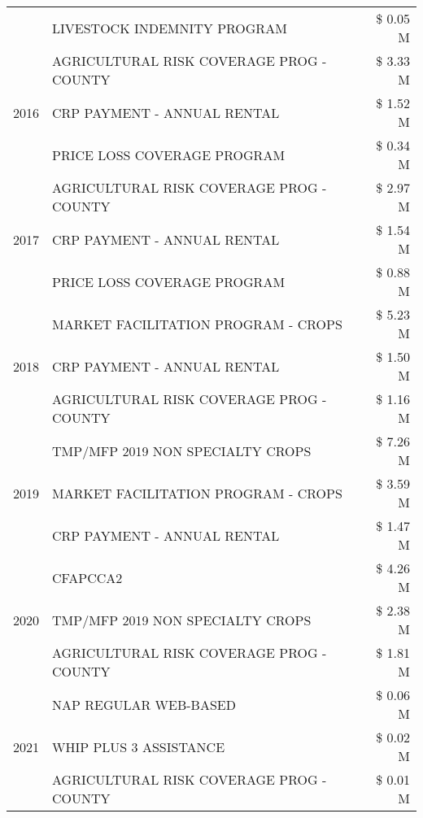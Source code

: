 \begin{tabular}{llr}
 & LIVESTOCK INDEMNITY PROGRAM & \$ 0.05 M \\
\cline{1-3}
\multirow[t]{3}{*}{2016} & AGRICULTURAL RISK COVERAGE PROG - COUNTY      & \$ 3.33 M \\
 & CRP PAYMENT - ANNUAL RENTAL                   & \$ 1.52 M \\
 & PRICE LOSS COVERAGE PROGRAM                   & \$ 0.34 M \\
\cline{1-3}
\multirow[t]{3}{*}{2017} & AGRICULTURAL RISK COVERAGE PROG - COUNTY & \$ 2.97 M \\
 & CRP PAYMENT - ANNUAL RENTAL & \$ 1.54 M \\
 & PRICE LOSS COVERAGE PROGRAM & \$ 0.88 M \\
\cline{1-3}
\multirow[t]{3}{*}{2018} & MARKET FACILITATION PROGRAM - CROPS & \$ 5.23 M \\
 & CRP PAYMENT - ANNUAL RENTAL & \$ 1.50 M \\
 & AGRICULTURAL RISK COVERAGE PROG - COUNTY & \$ 1.16 M \\
\cline{1-3}
\multirow[t]{3}{*}{2019} & TMP/MFP 2019 NON SPECIALTY CROPS & \$ 7.26 M \\
 & MARKET FACILITATION PROGRAM - CROPS & \$ 3.59 M \\
 & CRP PAYMENT - ANNUAL RENTAL & \$ 1.47 M \\
\cline{1-3}
\multirow[t]{3}{*}{2020} & CFAPCCA2 & \$ 4.26 M \\
 & TMP/MFP 2019 NON SPECIALTY CROPS & \$ 2.38 M \\
 & AGRICULTURAL RISK COVERAGE PROG - COUNTY & \$ 1.81 M \\
\cline{1-3}
\multirow[t]{3}{*}{2021} & NAP REGULAR WEB-BASED & \$ 0.06 M \\
 & WHIP PLUS 3 ASSISTANCE & \$ 0.02 M \\
 & AGRICULTURAL RISK COVERAGE PROG - COUNTY & \$ 0.01 M \\
\cline{1-3}
\bottomrule
\end{tabular}
